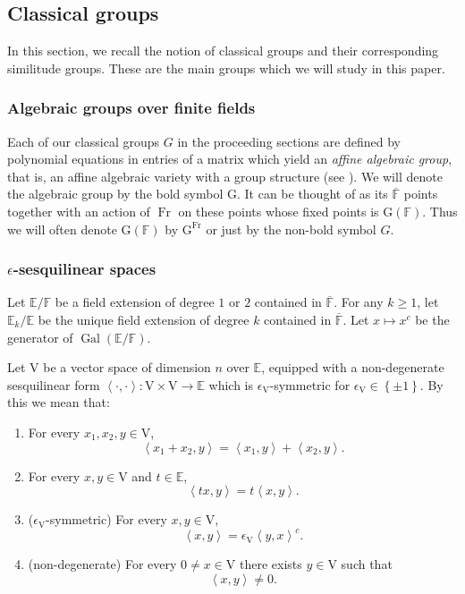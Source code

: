 \documentclass[12pt, reqno]{amsart}
\theoremstyle{definition}
\theoremstyle{definition}
\theoremstyle{definition}
\newcommand{\hermitianSpace}{\mathrm{V}}
\newcommand{\innerproduct}[2]{\left\langle #1,#2\right\rangle}
\newcommand{\involution}[1]{#1^{c}}
\newcommand{\finiteField}{\mathbb{F}}
\newcommand{\quadraticExtension}{\mathbb{E}}
\newcommand{\quadraticFieldExtension}[1]{\quadraticExtension_{#1}}
\newcommand{\algebraicClosure}[1]{\overline{#1}}
\newcommand{\Galois}{\operatorname{Gal}}
\newcommand{\Frobenius}{\operatorname{Fr}}
\newcommand{\algebraicGroup}[1]{\boldsymbol{\mathrm{#1}}}
\begin{document}
\subsection{Classical groups}

In this section, we recall the notion of classical groups and their corresponding similitude groups. These are the main groups which we will study in this paper.

\subsubsection{Algebraic groups over finite fields}
Each of our classical groups $G$ in the proceeding sections are defined by polynomial equations in entries of a matrix which yield an \emph{affine algebraic group}, that is, an affine algebraic variety with a group structure (see \cite[Section 0]{DigneMichel1991}). 
We will denote the algebraic group by the bold symbol $\algebraicGroup{G}$. 
It can be thought of as its $\algebraicClosure{\finiteField}$ points together with an action of $\Frobenius$ on these points whose fixed points is $\algebraicGroup{G}(\finiteField)$. 
Thus we will often denote $\algebraicGroup{G}(\finiteField)$ by $\algebraicGroup{G}^{\Frobenius}$ or just by the non-bold symbol $G$.


\subsubsection{$\epsilon$-sesquilinear spaces}
Let $\quadraticExtension \slash \finiteField$ be a field extension of degree $1$ or $2$ contained in $\algebraicClosure{\finiteField}$. For any $k \ge 1$, let $\quadraticFieldExtension{k} \slash \quadraticExtension$ be the unique field extension of degree $k$ contained in $\algebraicClosure{\finiteField}$. Let $x \mapsto \involution{x}$ be the generator of $\Galois\left(\quadraticExtension \slash \finiteField\right)$.

Let $\hermitianSpace$ be a vector space of dimension $n$ over $\quadraticExtension$, equipped with a non-degenerate sesquilinear form $\innerproduct{\cdot}{\cdot} \colon \hermitianSpace \times \hermitianSpace \to \quadraticExtension$ which is $\epsilon_{\hermitianSpace}$-symmetric for $\epsilon_{\hermitianSpace} \in \left\{\pm 1\right\}$. By this we mean that:
\begin{enumerate}
	\item For every $x_1,x_2,y \in \hermitianSpace$, $$\innerproduct{x_1 + x_2}{y} = \innerproduct{x_1}{y} + \innerproduct{x_2}{y}.$$
	\item For every $x,y \in \hermitianSpace$ and $t \in \quadraticExtension$, $$\innerproduct{tx}{y} = t\innerproduct{x}{y}.$$
	\item ($\epsilon_{\hermitianSpace}$-symmetric) For every $x,y \in \hermitianSpace$, $$\innerproduct{x}{y} = \epsilon_{\hermitianSpace} \involution{\innerproduct{y}{x}}.$$
	\item (non-degenerate) For every $0 \ne x \in \hermitianSpace$ there exists $y \in \hermitianSpace$ such that $$\innerproduct{x}{y} \ne 0.$$
\end{enumerate}
\end{document}
